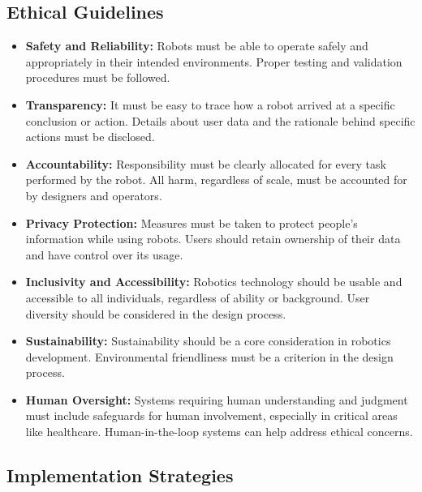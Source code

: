 \subsection{Ethical Guidelines}

\begin{itemize}
    \item \textbf{Safety and Reliability:} Robots must be able to operate safely and appropriately in their intended environments. Proper testing and validation procedures must be followed.
    
    \item \textbf{Transparency:} It must be easy to trace how a robot arrived at a specific conclusion or action. Details about user data and the rationale behind specific actions must be disclosed.
    
    \item \textbf{Accountability:} Responsibility must be clearly allocated for every task performed by the robot. All harm, regardless of scale, must be accounted for by designers and operators.
    
    \item \textbf{Privacy Protection:} Measures must be taken to protect people's information while using robots. Users should retain ownership of their data and have control over its usage.
    
    \item \textbf{Inclusivity and Accessibility:} Robotics technology should be usable and accessible to all individuals, regardless of ability or background. User diversity should be considered in the design process.
    
    \item \textbf{Sustainability:} Sustainability should be a core consideration in robotics development. Environmental friendliness must be a criterion in the design process.
    
    \item \textbf{Human Oversight:} Systems requiring human understanding and judgment must include safeguards for human involvement, especially in critical areas like healthcare. Human-in-the-loop systems can help address ethical concerns.
\end{itemize}

\subsection{Implementation Strategies}

